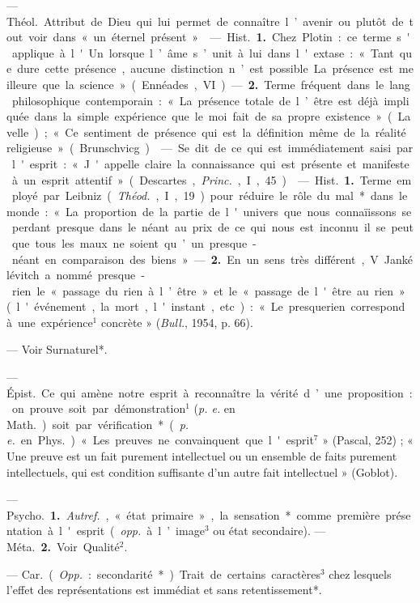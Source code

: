 \begin{itemize}[leftmargin=1cm, label=, itemsep=1pt]
 — \si{Théol.} Attribut de Dieu
qui lui permet de connaître l’avenir
ou plutôt de tout voir dans « un
éternel présent ».

 — \si{Hist.} {\bf 1.} Chez Plotin : ce
terme s'applique à l'Un lorsque
l’âme s’unit à lui dans l'extase :
« Tant que dure cette présence,
aucune distinction n’est possible...
La présence est meilleure que la
science » (Ennéades, VI). — {\bf 2.} Terme
fréquent dans le lang. philosophique
contemporain : « La présence totale
de l’être est déjà impliquée dans la
simple expérience que le moi fait
de sa propre existence » (Lavelle) ;
« Ce sentiment de présence qui est la
définition même de la réalité religieuse » (Brunschvicg).

 — Se dit de ce qui est immédiatement saisi par l'esprit : « J'appelle claire la connaissance qui est
présente et manifeste à un esprit
attentif » (Descartes, {\it Princ.}, I, 45).

 — \si{Hist.} {\bf 1.} Terme em
ployé par Leibniz ({\it Théod.}, I, 19)
pour réduire le rôle du mal* dans
le monde : « La proportion de la
partie de l'univers que nous connaïissons se perdant presque dans le
néant au prix de ce qui nous est
inconnu... il se peut que tous les
maux ne soient qu’un presque-néant
en comparaison des biens ». — {\bf 2.} En
un sens très différent, V. Jankélévitch a nommé presque-rien le « passage du rien à l’être » et le « passage
de l'être au rien » (l'événement, la
mort, l'instant, etc.) : « Le presquerien correspond à une expérience$^1$
concrète » ({\it Bull.}, 1954, p. 66).

 — Voir Surnaturel*.

 — \si{Épist.} Ce qui amène notre
esprit à reconnaître la vérité d’une
proposition : on prouve soit par
démonstration$^1$ ({\it p. e.} en \si{Math.}) soit
par vérification* ({\it p. e.} en \si{Phys.})

« Les preuves ne convainquent que
l'esprit$^7$ » (Pascal, 252) ; « Une
preuve est un fait purement intellectuel ou un ensemble de faits purement
intellectuels, qui est condition suffisante d’un autre fait intellectuel » (Goblot).

 — \si{Psycho.} {\bf 1.} {\it Autref.}, « état
primaire », la sensation* comme première présentation à l'esprit ({\it opp.} à
l’image$^3$ ou état secondaire). —
\si{Méta.} {\bf 2.} Voir Qualité$^2$.

 — \si{Car.} ({\it Opp.} : secondarité*).
Trait de certains caractères$^3$ chez
lesquels l'effet des représentations
est immédiat et sans retentissement*.


\end{itemize}
